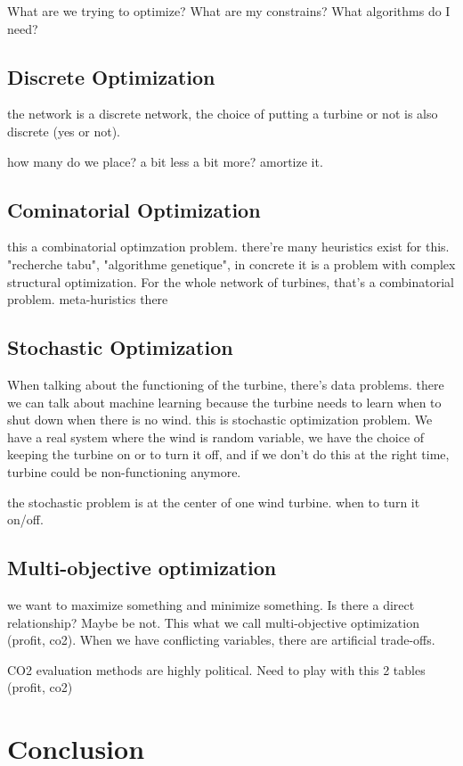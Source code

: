 \documentclass[12pt]{article}
\begin{document}
What are we trying to optimize? What are my constrains? What algorithms do I need?

\subsection{Discrete Optimization}
the network is a discrete network, the choice of putting a turbine or not is also
discrete (yes or not). 

how many do we place? a bit less a bit more? amortize it.

\subsection{Cominatorial Optimization}
this a combinatorial optimzation problem. there're many heuristics exist for this. 
"recherche tabu", "algorithme genetique", in concrete it is a problem with complex
structural optimization. 
For the whole network of turbines, that's a combinatorial problem. meta-huristics there


\subsection{Stochastic Optimization}
When talking about the functioning of the turbine, there's data problems.
there we can talk about machine learning because the turbine needs to learn when to shut down when there is no wind. this is stochastic optimization problem. We have a real 
system where the wind is random variable, we have the choice of keeping the turbine on or to turn it off, and if we don't do this at the right time, turbine could be non-functioning anymore. 

the stochastic problem is at the center of one wind turbine. when to turn it on/off.

\subsection{Multi-objective optimization}
we want to maximize something and minimize something. Is there a direct relationship?
Maybe be not. This what we call multi-objective optimization (profit, co2). When we have conflicting variables, there are artificial trade-offs. 

CO2 evaluation methods are highly political. Need to play with this 2 tables (profit, co2)

\section{Conclusion}
\end{document}
